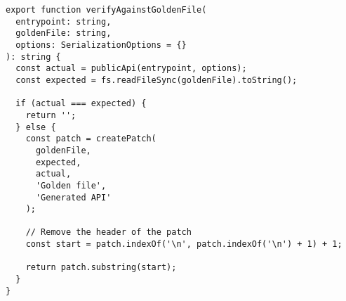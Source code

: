 \begin{verbatim}
export function verifyAgainstGoldenFile(
  entrypoint: string,
  goldenFile: string,
  options: SerializationOptions = {}
): string {
  const actual = publicApi(entrypoint, options);
  const expected = fs.readFileSync(goldenFile).toString();

  if (actual === expected) {
    return '';
  } else {
    const patch = createPatch(
      goldenFile,
      expected,
      actual,
      'Golden file',
      'Generated API'
    );

    // Remove the header of the patch
    const start = patch.indexOf('\n', patch.indexOf('\n') + 1) + 1;

    return patch.substring(start);
  }
}
\end{verbatim}
